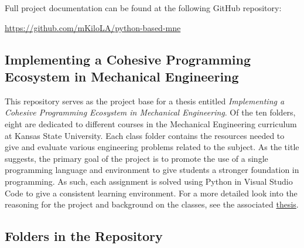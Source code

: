 Full project documentation can be found at the following GitHub repository: 

\begin{center}
    \url{https://github.com/mKiloLA/python-based-mne}
\end{center}

\subsection*{Implementing a Cohesive Programming Ecosystem in Mechanical Engineering}

This repository serves as the project base for a thesis entitled
\textit{Implementing a Cohesive Programming Ecosystem in Mechanical Engineering}. 
Of the ten folders, eight are dedicated to different courses in the Mechanical 
Engineering curriculum at Kansas State University. Each class folder contains the 
resources needed to give and evaluate various engineering problems related to the 
subject. As the title suggests, the primary goal of the project is to promote the 
use of a single programming language and environment to give students a stronger 
foundation in programming. As such, each assignment is solved using Python in Visual 
Studio Code to give a consistent learning environment. For a more detailed look into 
the reasoning for the project and background on the classes, see the associated 
\href{https://github.com/mKiloLA/python-based-mne/tree/develop/thesis}{thesis}.

\subsection*{Folders in the Repository}

